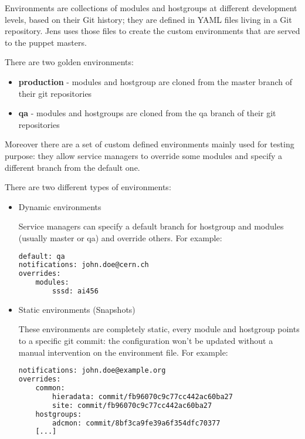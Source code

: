 Environments are collections of modules and hostgroups at different
development levels, based on their Git history; they are defined in YAML
\cite{YAMLWebsite} files living in a Git repository. Jens uses those files
to create the custom environments that are served to the puppet masters.

There are two golden environments:

\begin{itemize}
    \item \textbf{production} - modules and hostgroup are cloned from the master branch of
their git repositories
    \item \textbf{qa} - modules and hostgroups are cloned from the qa branch of their git
repositories
\end{itemize}

Moreover there are a set of custom defined environments mainly used for
testing purpose: they allow service managers to override some modules and
specify a different branch from the default one.

There are two different types of environments:

\begin{itemize} 
    \item Dynamic environments

Service managers can specify a default branch for hostgroup and modules
(usually master or qa) and override others. For example:

\begin{lstlisting}[language=bash, frame=single]
default: qa
notifications: john.doe@cern.ch
overrides:
    modules:
        sssd: ai456
\end{lstlisting}

    \item Static environments (Snapshots) 
    
These environments are completely static, every module and hostgroup
points to a specific git commit: the configuration won't be updated
without a manual intervention on the environment file. For example:

\begin{lstlisting}[language=bash, frame=single]
notifications: john.doe@example.org
overrides:
    common:
        hieradata: commit/fb96070c9c77cc442ac60ba27
        site: commit/fb96070c9c77cc442ac60ba27
    hostgroups:
        adcmon: commit/8bf3ca9fe39a6f354dfc70377
    [...]
\end{lstlisting}
\end{itemize}
